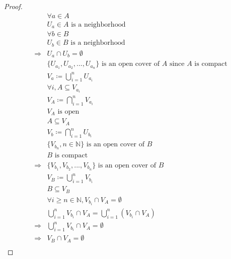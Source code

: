 \documentclass{article}
\begin{document}
\begin{proof}
    \begin{align*}
        &\forall a\in A\\
        &U_a\in A\text{ is a neighborhood}\\
        &\forall b\in B\\
        &U_b\in B\text{ is a neighborhood}\\
        \Rightarrow&U_a\cap U_b=\emptyset\\
        &\{U_{a_1},U_{a_2},...,U_{a_n}\}\text{ is an open cover of }A\text{ since }A\text{ is compact}\\
        &V_a\coloneqq\bigcup_{i=1}^{n}U_{a_i}\\
        &\forall i,A\subseteq V_{a_i}\\
        &V_A\coloneqq \bigcap_{i=1}^{n}V_{a_i}\\
        &V_A\text{ is open}\\
        &A\subseteq V_A\\
        &V_b\coloneqq \bigcap_{i=1}^{n}U_{b_i}\\
        &\{V_{b_n},n\in\mathbb{N} \}\text{ is an open cover of }B\\
        &B\text{ is compact}\\
        \Rightarrow&\{V_{b_1},V_{b_2},...,V_{b_n}\}\text{ is an open cover of }B\\
        &V_B\coloneqq\bigcup_{i=1}^{n}V_{b_i}\\
        &B\subseteq V_B\\
        &\forall i\geqslant n\in \mathbb{N} ,V_{b_i}\cap V_A=\emptyset\\
        &\bigcup_{i=1}^{n}V_{b_i}\cap V_A=\bigcup_{i=1}^{n}(V_{b_i}\cap V_A)\\
        \Rightarrow&\bigcup_{i=1}^{n}V_{b_i}\cap V_A=\emptyset\\
        \Rightarrow&V_B\cap V_A=\emptyset\\
    \end{align*}
\end{proof}
\end{document}

